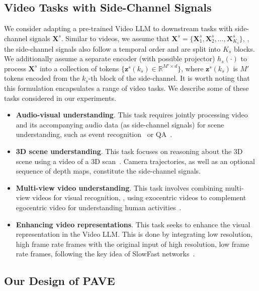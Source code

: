 \subsection{Video Tasks with Side-Channel Signals}
We consider adapting a pre-trained Video LLM to downstream tasks with side-channel signals $\mathbf{X}^s$. Similar to videos, we assume that $\mathbf{X}^s = \{\mathbf{X}^s_1, \mathbf{X}^s_2, ..., \mathbf{X}^s_{K_s}\}$, \ie, the side-channel signals also follow a temporal order and are split into $K_s$ blocks. We additionally assume a separate encoder (with possible projector) $h_s(\cdot)$ to process $\mathbf{X}^s$ into a collection of tokens $\{\mathbf{z}^s(k_s) \in \mathbb{R}^{M' \times d} \}$, where $\mathbf{z}^s(k_s)$ is $M'$ tokens encoded from the $k_s$-th block of the side-channel.  It is worth noting that this formulation encapsulates a range of video tasks. We describe some of these tasks considered in our experiments. 

\begin{itemize}
    \item \textbf{Audio-visual understanding}. This task requires jointly processing video and its accompanying audio data (as side-channel signals) for scene understanding, such as event recognition~\cite{xiao2020audiovisual} or QA~\cite{alamri2019audiovisualsceneawaredialog}. 
    \item \textbf{3D scene understanding}. This task focuses on reasoning about the 3D scene using a video of a 3D scan~\cite{azuma_2022_CVPR}. Camera trajectories, as well as an optional sequence of depth maps, constitute the side-channel signals.  
    \item \textbf{Multi-view video understanding}. This task involves combining multi-view videos for visual recognition, \eg, using exocentric videos to complement egocentric video for understanding human activities~\cite{grauman2024ego}. 
    \item \textbf{Enhancing video representations}. This task seeks to enhance the visual representation in the Video LLM. This is done by integrating low resolution, high frame rate frames with the original input of high resolution, low frame rate frames, following the key idea of SlowFast networks~\cite{feichtenhofer2019slowfastnetworksvideorecognition}.

\end{itemize}

\subsection{Our Design of PAVE}

